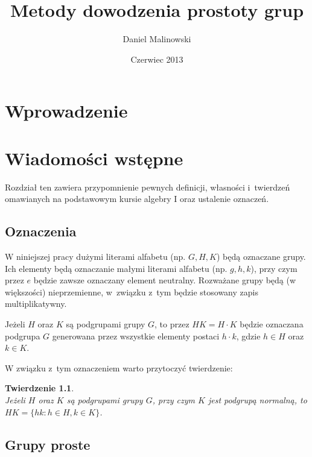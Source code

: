 \documentclass[licencjacka]{pracamgr}
\author{Daniel Malinowski}
\title{Metody dowodzenia prostoty grup}
\date{Czerwiec 2013}
\newtheorem{thh}{Twierdzenie}[section]
\begin{document}
\maketitle

\begin{abstract}
\end{abstract}

\tableofcontents


\chapter*{Wprowadzenie}

\chapter{Wiadomości wstępne}

Rozdział ten zawiera przypomnienie pewnych definicji, własności i~twierdzeń omawianych na podstawowym kursie algebry I
oraz ustalenie oznaczeń.

\section{Oznaczenia}

W niniejszej pracy dużymi literami alfabetu (np. $G, H, K$) będą oznaczane grupy.
Ich elementy będą oznaczanie małymi literami alfabetu (np. $g, h, k$), przy czym przez $e$ będzie zawsze oznaczany element neutralny.
Rozważane grupy będą (w większości) nieprzemienne, w~związku z~tym będzie stosowany zapis multiplikatywny.

Jeżeli $H$ oraz $K$ są podgrupami grupy $G$, to przez $H K = H \cdot K$ będzie oznaczana podgrupa $G$ 
generowana przez wszystkie elementy postaci $h \cdot k$, gdzie $h \in H$ oraz $k \in K$.

W związku z~tym oznaczeniem warto przytoczyć twierdzenie:

\begin{thh} \label{mult_groups} $ $ \\
	Jeżeli $H$ oraz $K$ są podgrupami grupy $G$, przy czym $K$ jest podgrupą normalną,
	to $HK = \{ h k \colon h \in H, k \in K\}$.
\end{thh}


\section{Grupy proste}
\end{document}
